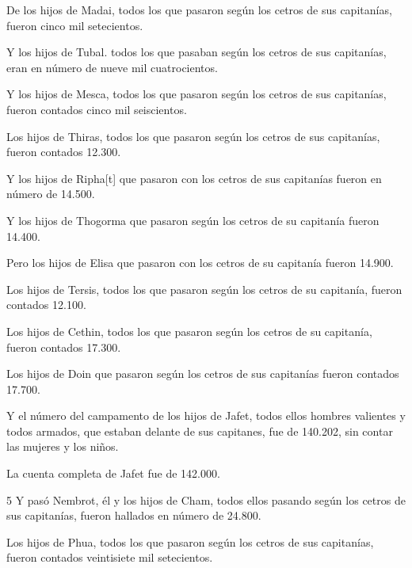 \par De los hijos de Madai, todos los que pasaron según los cetros de sus capitanías, fueron cinco mil setecientos.

\par Y los hijos de Tubal. todos los que pasaban según los cetros de sus capitanías, eran en número de nueve mil cuatrocientos.

\par Y los hijos de Mesca, todos los que pasaron según los cetros de sus capitanías, fueron contados cinco mil seiscientos.

\par Los hijos de Thiras, todos los que pasaron según los cetros de sus capitanías, fueron contados 12.300.

\par Y los hijos de Ripha[t] que pasaron con los cetros de sus capitanías fueron en número de 14.500.

\par Y los hijos de Thogorma que pasaron según los cetros de su capitanía fueron 14.400.

\par Pero los hijos de Elisa que pasaron con los cetros de su capitanía fueron 14.900.

\par Los hijos de Tersis, todos los que pasaron según los cetros de su capitanía, fueron contados 12.100.

\par Los hijos de Cethin, todos los que pasaron según los cetros de su capitanía, fueron contados 17.300.

\par Los hijos de Doin que pasaron según los cetros de sus capitanías fueron contados 17.700.

\par Y el número del campamento de los hijos de Jafet, todos ellos hombres valientes y todos armados, que estaban delante de sus capitanes, fue de 140.202, sin contar las mujeres y los niños.

\par La cuenta completa de Jafet fue de 142.000.

\par 5 Y pasó Nembrot, él y los hijos de Cham, todos ellos pasando según los cetros de sus capitanías, fueron hallados en número de 24.800.

\par Los hijos de Phua, todos los que pasaron según los cetros de sus capitanías, fueron contados veintisiete mil setecientos.

